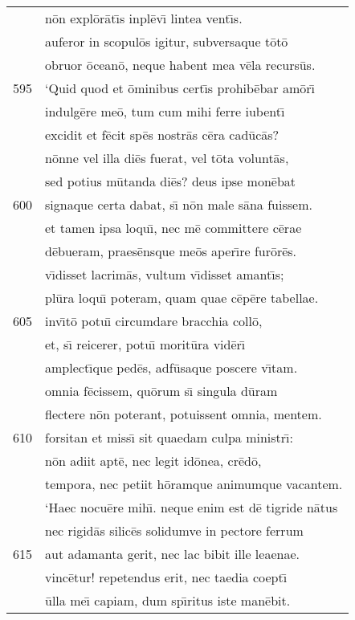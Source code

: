 \documentclass[paper=6in:9in,pagesize=pdftex,
               headinclude=on,footinclude=on,12pt]{scrbook}
\begin{document}
\begin{longtable}[p]{ r l }
 & n\=on expl\=or\=at\={\i}s inpl\=ev\={\i} lintea vent\={\i}s.\\ 
 & auferor in scopul\=os igitur, subversaque t\=ot\=o\\ 
 & obruor \=ocean\=o, neque habent mea v\=ela recurs\=us.\\ 
595 & \indent `Quid quod et \=ominibus cert\={\i}s prohib\=ebar am\=or\={\i}\\ 
 & indulg\=ere me\=o, tum cum mihi ferre iubent\={\i}\\ 
 & excidit et f\=ecit sp\=es nostr\=as c\=era cad\=uc\=as?\\ 
 & n\=onne vel illa di\=es fuerat, vel t\=ota volunt\=as,\\ 
 & sed potius m\=utanda di\=es? deus ipse mon\=ebat\\ 
600 & signaque certa dabat, s\={\i} n\=on male s\=ana fuissem.\\ 
 & et tamen ipsa loqu\={\i}, nec m\=e committere c\=erae\\ 
 & d\=ebueram, praes\=ensque me\=os aper\={\i}re fur\=or\=es.\\ 
 & v\={\i}disset lacrim\=as, vultum v\={\i}disset amant\={\i}s;\\ 
 & pl\=ura loqu\={\i} poteram, quam quae c\=ep\=ere tabellae.\\ 
605 & inv\={\i}t\=o potu\={\i} circumdare bracchia coll\=o,\\ 
 & et, s\={\i} reicerer, potu\={\i} morit\=ura vid\=er\={\i}\\ 
 & amplect\={\i}que ped\=es, adf\=usaque poscere v\={\i}tam.\\ 
 & omnia f\=ecissem, qu\=orum s\={\i} singula d\=uram\\ 
 & flectere n\=on poterant, potuissent omnia, mentem.\\ 
610 & forsitan et miss\={\i} sit quaedam culpa ministr\={\i}:\\ 
 & n\=on adiit apt\=e, nec legit id\=onea, cr\=ed\=o,\\ 
 & tempora, nec petiit h\=oramque animumque vacantem.\\ 
 & \indent `Haec nocu\=ere mih\={\i}. neque enim est d\=e tigride n\=atus\\ 
 & nec rigid\=as silic\=es solidumve in pectore ferrum\\ 
615 & aut adamanta gerit, nec lac bibit ille leaenae.\\ 
 & vinc\=etur! repetendus erit, nec taedia coept\={\i}\\ 
 & \=ulla me\={\i} capiam, dum sp\={\i}ritus iste man\=ebit.\\ 

\end{longtable}
\end{document}
